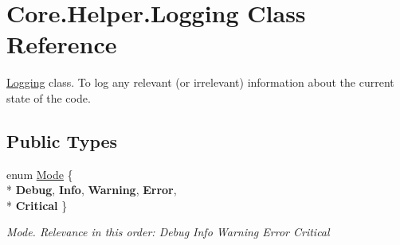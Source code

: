 \hypertarget{classCore_1_1Helper_1_1Logging}{}\section{Core.\+Helper.\+Logging Class Reference}
\label{classCore_1_1Helper_1_1Logging}


\hyperlink{classCore_1_1Helper_1_1Logging}{Logging} class. To log any relevant (or irrelevant) information about the current state of the code.  


\subsection*{Public Types}
\begin{DoxyCompactItemize}
\item 
enum \hyperlink{classCore_1_1Helper_1_1Logging_aff45583600750b779f0cc9fc5a63a27e}{Mode} \{ \\*
{\bfseries Debug}, 
{\bfseries Info}, 
{\bfseries Warning}, 
{\bfseries Error}, 
\\*
{\bfseries Critical}
 \}\begin{DoxyCompactList}\small\item\em Mode. Relevance in this order\+: Debug Info Warning Error Critical \end{DoxyCompactList}
\end{DoxyCompactItemize}
